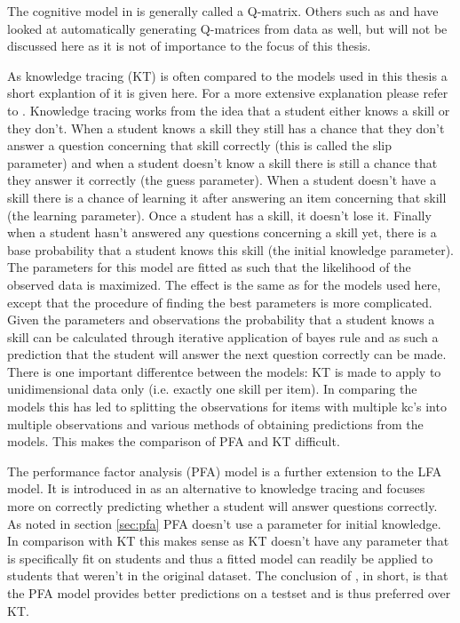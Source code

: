 \documentclass{scrartcl}
\begin{document}
The cognitive model in \cite{lfa} is generally called a Q-matrix. Others such as \cite{qm1} and \cite{qm2} have looked at automatically generating Q-matrices from data as well, but will not be discussed here as it is not of importance to the focus of this thesis.

As knowledge tracing (KT) is often compared to the models used in this thesis a short explantion of it is given here. For a more extensive explanation please refer to \cite{kt}. Knowledge tracing works from the idea that a student either knows a skill or they don't. When a student knows a skill they still has a chance that they don't answer a question concerning that skill correctly (this is called the slip parameter) and when a student doesn't know a skill there is still a chance that they answer it correctly (the guess parameter). When a student doesn't have a skill there is a chance of learning it after answering an item concerning that skill (the learning parameter). Once a student has a skill, it doesn't lose it. Finally when a student hasn't answered any questions concerning a skill yet, there is a base probability that a student knows this skill (the initial knowledge parameter). The parameters for this model are fitted as such that the likelihood of the observed data is maximized. The effect is the same as for the models used here, except that the procedure of finding the best parameters is more complicated. Given the parameters and observations the probability that a student knows a skill can be calculated through iterative application of bayes rule and as such a prediction that the student will answer the next question correctly can be made. There is one important differentce between the models: KT is made to apply to unidimensional data only (i.e. exactly one skill per item). In comparing the models this has led to splitting the observations for items with multiple kc's into multiple observations and various methods of obtaining predictions from the models. This makes the comparison of PFA and KT difficult.

The performance factor analysis (PFA) model is a further extension to the LFA model. It is introduced in \cite{pfa} as an alternative to knowledge tracing and focuses more on correctly predicting whether a student will answer questions correctly. As noted in section \ref{sec:pfa} PFA doesn't use a parameter for initial knowledge. In comparison with KT this makes sense as KT doesn't have any parameter that is specifically fit on students and thus a fitted model can readily be applied to students that weren't in the original dataset. The conclusion of \cite{pfa}, in short, is that the PFA model provides better predictions on a testset and is thus preferred over KT.
\end{document}
